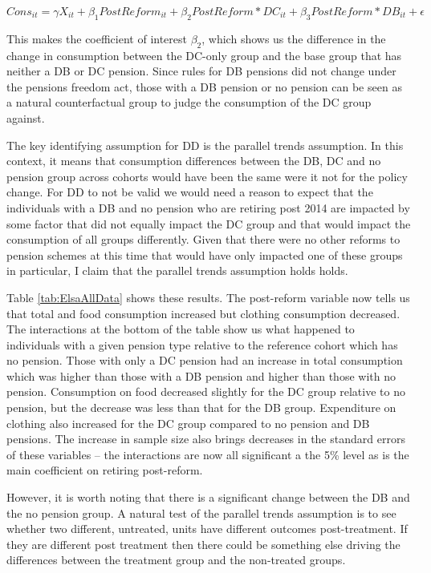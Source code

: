 \documentclass[12pt]{article}
\begin{document}
\begin{equation*}
    Cons_{it} =  \gamma X_{it} + \beta_{1} PostReform_{it} + \beta_{2} PostReform*DC_{it} + \beta_{3} PostReform*DB_{it}  + \epsilon
\end{equation*}


This makes the coefficient of interest $\beta_{2}$, which shows us the
difference in the change in consumption between the DC-only group and the base
group that has neither a DB or DC pension. Since rules for DB pensions did not
change under the pensions freedom act, those with a DB pension or no pension can
be seen as a natural counterfactual group to judge the consumption of the DC
group against.

The key identifying assumption for DD is the parallel trends assumption. In this
context, it means that consumption differences between the DB, DC and no pension
group across cohorts would have been the same were it not for the policy change.
For DD to not be valid we would need a reason to expect that the individuals
with a DB and no pension who are retiring post 2014 are impacted by some factor
that did not equally impact the DC group and that would impact the consumption
of all groups differently. Given that there were no other reforms to pension
schemes at this time that would have only impacted one of these groups in
particular, I claim that the parallel trends assumption holds holds.

Table \ref{tab:ElsaAllData} shows these results. The post-reform variable now
tells us that total and food consumption increased but clothing consumption
decreased. The interactions at the bottom of the table show us what happened to
individuals with a given pension type relative to the reference cohort which has
no pension. Those with only a DC pension had an increase in total consumption
which was higher than those with a DB pension and higher than those with no
pension. Consumption on food decreased slightly for the DC group relative to no
pension, but the decrease was less than that for the DB group. Expenditure on
clothing also increased for the DC group compared to no pension and DB pensions.
The increase in sample size also brings decreases in the standard errors of
these variables -- the interactions are now all significant a the 5\% level as
is the main coefficient on retiring post-reform.

However, it is worth noting that there is a significant change between the DB
and the no pension group. A natural test of the parallel trends assumption is to
see whether two different, untreated, units have different outcomes
post-treatment. If they are different post treatment then there could be
something else driving the differences between the treatment group and the
non-treated groups.
\end{document}
